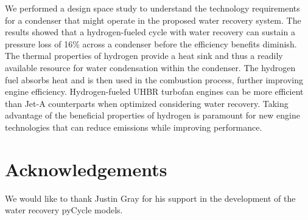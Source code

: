 \documentclass[conf]{new-aiaa}
\begin{document}
We performed a design space study to understand the technology requirements for a condenser that might operate in the proposed water recovery system.
The results showed that a hydrogen-fueled cycle with water recovery can sustain a pressure loss of 16\% across a condenser before the efficiency benefits diminish.
The thermal properties of hydrogen provide a heat sink and thus a readily available resource for water condensation within the condenser.
The hydrogen fuel absorbs heat and is then used in the combustion process, further improving engine efficiency.
Hydrogen-fueled UHBR turbofan engines can be more efficient than Jet-A counterparts when optimized considering water recovery.
Taking advantage of the beneficial properties of hydrogen is paramount for new engine technologies that can reduce emissions while improving performance.

\section{Acknowledgements}
\noindent
We would like to thank Justin Gray for his support in the development of the water recovery pyCycle models.


\end{document}
